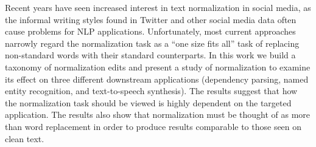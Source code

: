 Recent years have seen increased interest in text normalization in social media, as the informal writing styles found in Twitter and other social media data often cause problems for NLP applications. Unfortunately, most current approaches narrowly regard the normalization task as a ``one size fits all'' task of replacing non-standard words with their standard counterparts. In this work we build a taxonomy of normalization edits and present a study of normalization to examine its effect on three different downstream applications (dependency parsing, named entity recognition, and text-to-speech synthesis). The results suggest that how the normalization task should be viewed is highly dependent on the targeted application.                    The results also show that normalization must be thought of as more than word replacement in order to produce results comparable to those seen on clean text.
